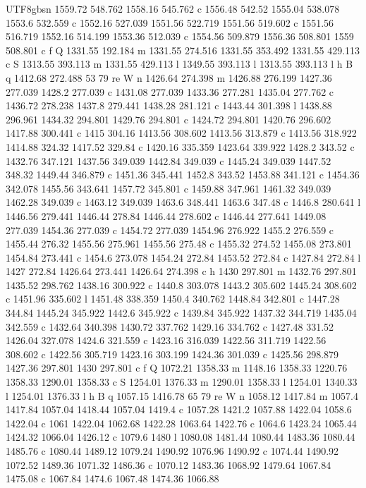 \documentclass[11pt,a4paper,oneside]{report}
\begin{document}
\begin{CJK*}{UTF8}{gbsn}
{1559.72 548.762 1558.16 545.762 c 1556.48 542.52 1555.04 538.078 1553.6 532.559 c 1552.16 527.039 1551.56
522.719 1551.56 519.602 c 1551.56 516.719 1552.16 514.199 1553.36 512.039 c 1554.56 509.879 1556.36
508.801 1559 508.801 c f Q 1331.55 192.184 m 1331.55 274.516 1331.55 353.492 1331.55 429.113 c S 1313.55
393.113 m 1331.55 429.113 l 1349.55 393.113 l 1313.55 393.113 l h B q 1412.68 272.488 53 79 re W n
1426.64 274.398 m 1426.88 276.199 1427.36 277.039 1428.2 277.039 c 1431.08 277.039 1433.36 277.281
1435.04 277.762 c 1436.72 278.238 1437.8 279.441 1438.28 281.121 c 1443.44 301.398 l 1438.88 296.961
1434.32 294.801 1429.76 294.801 c 1424.72 294.801 1420.76 296.602 1417.88 300.441 c 1415 304.16 1413.56
308.602 1413.56 313.879 c 1413.56 318.922 1414.88 324.32 1417.52 329.84 c 1420.16 335.359 1423.64 339.922
1428.2 343.52 c 1432.76 347.121 1437.56 349.039 1442.84 349.039 c 1445.24 349.039 1447.52 348.32 1449.44
346.879 c 1451.36 345.441 1452.8 343.52 1453.88 341.121 c 1454.36 342.078 1455.56 343.641 1457.72 345.801
c 1459.88 347.961 1461.32 349.039 1462.28 349.039 c 1463.12 349.039 1463.6 348.441 1463.6 347.48 c 1446.8
280.641 l 1446.56 279.441 1446.44 278.84 1446.44 278.602 c 1446.44 277.641 1449.08 277.039 1454.36
277.039 c 1454.72 277.039 1454.96 276.922 1455.2 276.559 c 1455.44 276.32 1455.56 275.961 1455.56 275.48
c 1455.32 274.52 1455.08 273.801 1454.84 273.441 c 1454.6 273.078 1454.24 272.84 1453.52 272.84 c 1427.84
272.84 l 1427 272.84 1426.64 273.441 1426.64 274.398 c h 1430 297.801 m 1432.76 297.801 1435.52 298.762
1438.16 300.922 c 1440.8 303.078 1443.2 305.602 1445.24 308.602 c 1451.96 335.602 l 1451.48 338.359
1450.4 340.762 1448.84 342.801 c 1447.28 344.84 1445.24 345.922 1442.6 345.922 c 1439.84 345.922 1437.32
344.719 1435.04 342.559 c 1432.64 340.398 1430.72 337.762 1429.16 334.762 c 1427.48 331.52 1426.04
327.078 1424.6 321.559 c 1423.16 316.039 1422.56 311.719 1422.56 308.602 c 1422.56 305.719 1423.16
303.199 1424.36 301.039 c 1425.56 298.879 1427.36 297.801 1430 297.801 c f Q 1072.21 1358.33 m 1148.16
1358.33 1220.76 1358.33 1290.01 1358.33 c S 1254.01 1376.33 m 1290.01 1358.33 l 1254.01 1340.33 l 1254.01
1376.33 l h B q 1057.15 1416.78 65 79 re W n 1058.12 1417.84 m 1057.4 1417.84 1057.04 1418.44 1057.04
1419.4 c 1057.28 1421.2 1057.88 1422.04 1058.6 1422.04 c 1061 1422.04 1062.68 1422.28 1063.64 1422.76 c
1064.6 1423.24 1065.44 1424.32 1066.04 1426.12 c 1079.6 1480 l 1080.08 1481.44 1080.44 1483.36 1080.44
1485.76 c 1080.44 1489.12 1079.24 1490.92 1076.96 1490.92 c 1074.44 1490.92 1072.52 1489.36 1071.32
1486.36 c 1070.12 1483.36 1068.92 1479.64 1067.84 1475.08 c 1067.84 1474.6 1067.48 1474.36 1066.88
}
\end{CJK*}
\end{document}
